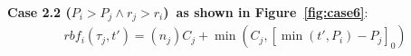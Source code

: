 \documentclass[12pt,conference,twocolumn]{IEEEtran}
\begin{document}
\textbf{Case 2.2 ($P_i>P_j\wedge r_j> r_i$)~as shown in  Figure~\ref{fig:case6}}: 
\begin{align*}
	rbf_i(\tau_j,t')=(n_j) C_j+\min\left(C_j,[\min(t',P_i)-P_j]_0\right)
\end{align*}
















\end{document}
